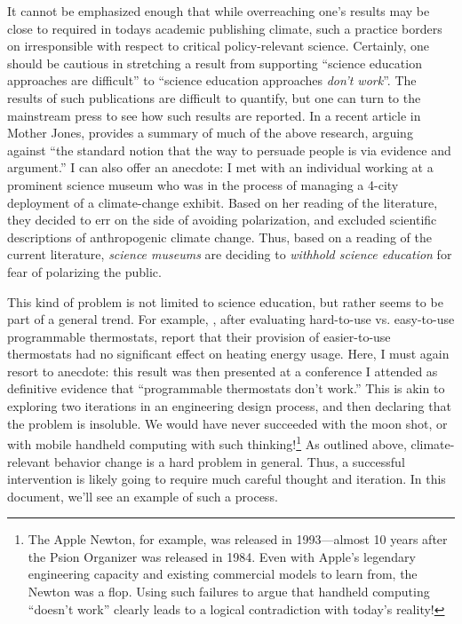 It cannot be emphasized enough that while overreaching one's results may be
close to required in todays academic publishing climate, such a practice borders
on irresponsible with respect to critical policy-relevant science. Certainly,
one should be cautious in stretching a result from supporting “science education
approaches are difficult” to “science education approaches \emph{don't work}”.
The results of such publications are difficult to quantify, but one can turn to
the mainstream press to see how such results are reported. In a recent article
in Mother Jones, \textcite{mooney_science_2011} provides a summary of much of
the above research, arguing against “the standard notion that the way to
persuade people is via evidence and argument.” I can also offer an anecdote: I
met with an individual working at a prominent science museum who was in the
process of managing a 4-city deployment of a climate-change exhibit.  Based on
her reading of the literature, they decided to err on the side of avoiding
polarization, and excluded scientific descriptions of anthropogenic climate
change. Thus, based on a reading of the current literature, \emph{science
    museums} are deciding to \emph{withhold science education} for fear of
polarizing the public.

This kind of problem is not limited to science education, but rather seems to be
part of a general trend. For example, \textcite{sachs_field_2012}, after evaluating
hard-to-use vs. easy-to-use programmable thermostats, report that their
provision of easier-to-use thermostats had no significant effect on heating
energy usage. Here, I must again resort to anecdote: this result was then
presented at a conference I attended as definitive evidence that “programmable
thermostats don't work.” 
This is akin to exploring two iterations in an
engineering design process, and then declaring that the problem is insoluble. We
would have never succeeded with the moon shot, or with mobile handheld computing
with such thinking!\footnote{The Apple Newton, for example, was released in
    1993---almost 10 years after the Psion Organizer was released in 1984. Even
    with Apple's legendary engineering capacity and existing commercial models
    to learn from, the Newton was a flop. Using such failures to argue that
    handheld computing “doesn't work” clearly leads to a logical contradiction
    with today's reality!}
As outlined above, climate-relevant behavior change is a hard problem in
general.  Thus, a successful intervention is likely going to require much
careful thought and iteration. In this document, we'll see an example of such a
process.


